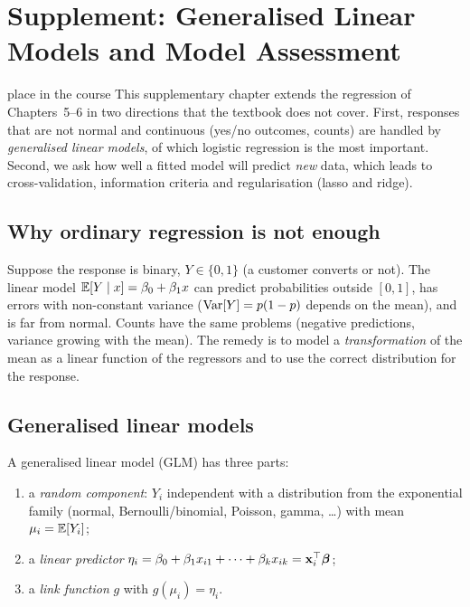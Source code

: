 \chapter{Supplement: Generalised Linear Models and Model Assessment}

\begin{nuance}{place in the course}
This supplementary chapter extends the regression of Chapters~5--6 in two directions that the textbook does not cover. First, responses that are not normal and continuous (yes/no outcomes, counts) are handled by \emph{generalised linear models}, of which logistic regression is the most important. Second, we ask how well a fitted model will predict \emph{new} data, which leads to cross-validation, information criteria and regularisation (lasso and ridge).
\end{nuance}

\section{Why ordinary regression is not enough}

Suppose the response is binary, $Y\in\{0,1\}$ (a customer converts or not). The linear model $\mathbb{E}[Y\mid x]=\beta_0+\beta_1x$ can predict probabilities outside $[0,1]$, has errors with non-constant variance ($\operatorname{Var}[Y]=p(1-p)$ depends on the mean), and is far from normal. Counts have the same problems (negative predictions, variance growing with the mean). The remedy is to model a \emph{transformation} of the mean as a linear function of the regressors and to use the correct distribution for the response.

\section{Generalised linear models}

\begin{definition}
A generalised linear model (GLM) has three parts:
\begin{enumerate}[label=(\arabic*)]
  \item a \emph{random component}: $Y_i$ independent with a distribution from the exponential family (normal, Bernoulli/binomial, Poisson, gamma, \dots) with mean $\mu_i=\mathbb{E}[Y_i]$;
  \item a \emph{linear predictor} $\eta_i=\beta_0+\beta_1x_{i1}+\dots+\beta_kx_{ik}=\mathbf{x}_i^{\top}\boldsymbol\beta$;
  \item a \emph{link function} $g$ with $g(\mu_i)=\eta_i$.
\end{enumerate}
\end{definition}

